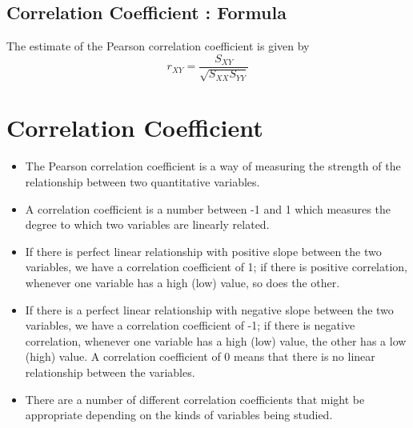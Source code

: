 \documentclass[]{report}
\begin{document}

\subsection{Correlation Coefficient : Formula}
The estimate of the Pearson correlation coefficient is given by
\[ r_{XY} = \frac{S_{XY}}{\sqrt{S_{XX}S_{YY}}} \]





\section{Correlation Coefficient}
\begin{itemize}
\item The Pearson correlation coefficient is a way of measuring the
strength of the relationship between two quantitative variables.

\item A correlation coefficient is a number between -1 and 1 which measures the degree to which two variables are linearly related. 
\item If there is perfect linear relationship with positive slope between the two variables, we have a correlation coefficient of 1; if there is positive correlation, whenever one variable has a high (low) value, so does the other. 
\item If there is a perfect linear relationship with negative slope between the two variables, we have a correlation coefficient of -1; if there is negative correlation, whenever one variable has a high (low) value, the other has a low (high) value. A correlation coefficient of 0 means that there is no linear relationship between the variables.
\item 
There are a number of different correlation coefficients that might be appropriate depending on the kinds of variables being studied.
\end{itemize}




\end{document}
